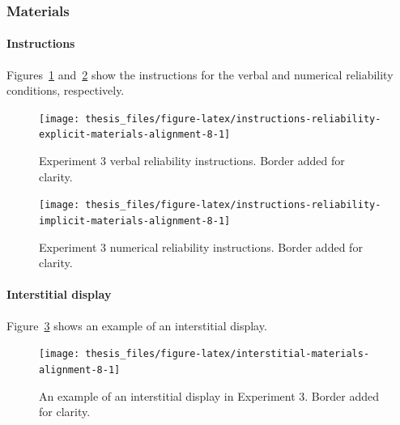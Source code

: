 \documentclass[a4paper, nobind, dvipsnames]{templates/ociamthesis}
\theoremstyle{definition}
\theoremstyle{definition}
\theoremstyle{definition}
\theoremstyle{definition}
\theoremstyle{remark}
\begin{document}
\newpage

\subsubsection{Materials}

\hypertarget{instructions-materials-alignment-8-appendix}{%
\paragraph{Instructions}\label{instructions-materials-alignment-8-appendix}}

Figures~\ref{fig:instructions-reliability-explicit-materials-alignment-8}
and~\ref{fig:instructions-reliability-implicit-materials-alignment-8} show the
instructions for the verbal and numerical reliability conditions, respectively.



\begin{figure}
\texttt{[image: thesis\_files/figure-latex/instructions-reliability-explicit-materials-alignment-8-1]} \caption{Experiment 3 verbal reliability instructions. Border added for clarity.}\label{fig:instructions-reliability-explicit-materials-alignment-8}
\end{figure}



\begin{figure}
\texttt{[image: thesis\_files/figure-latex/instructions-reliability-implicit-materials-alignment-8-1]} \caption{Experiment 3 numerical reliability instructions. Border added for clarity.}\label{fig:instructions-reliability-implicit-materials-alignment-8}
\end{figure}

\hypertarget{interstitial-materials-alignment-8}{%
\paragraph{Interstitial display}\label{interstitial-materials-alignment-8}}

Figure~\ref{fig:interstitial-materials-alignment-8} shows an example of an
interstitial display.



\begin{figure}
\texttt{[image: thesis\_files/figure-latex/interstitial-materials-alignment-8-1]} \caption{An example of an interstitial display in Experiment 3. Border added for clarity.}\label{fig:interstitial-materials-alignment-8}
\end{figure}
\end{document}
